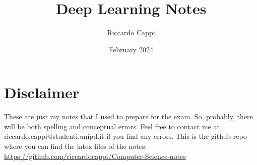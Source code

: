 \documentclass{book}
\title{Deep Learning Notes}
\author{Riccardo Cappi}
\date{February 2024}
\begin{document}
\maketitle

\section{Disclaimer}
These are just my notes that I used to prepare for the exam. So, probably, there will be both spelling and conceptual errors. Feel free to contact me at riccardo.cappi@studenti.unipd.it if you find any errors. This is the github repo where you can find the latex files of the notes: \url{https://github.com/riccardocappi/Computer-Science-notes}

\tableofcontents




















\end{document}

